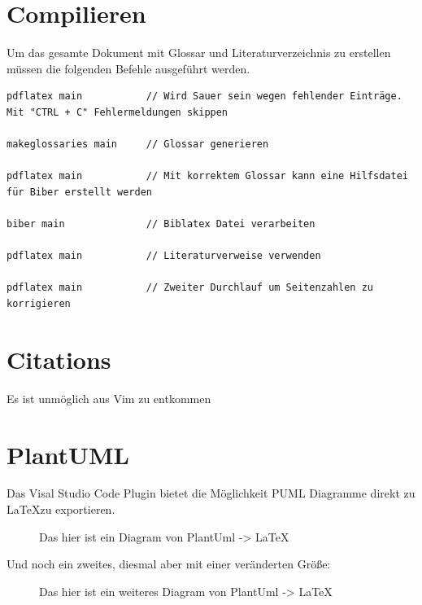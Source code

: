 \section{Compilieren}
Um das gesamte Dokument mit Glossar und Literaturverzeichnis zu erstellen müssen die folgenden Befehle ausgeführt werden.

\begin{lstlisting}[caption=Compilieren des Dokuments, label=CompileInstructions]
pdflatex main           // Wird Sauer sein wegen fehlender Einträge. Mit "CTRL + C" Fehlermeldungen skippen

makeglossaries main     // Glossar generieren

pdflatex main           // Mit korrektem Glossar kann eine Hilfsdatei für Biber erstellt werden

biber main              // Biblatex Datei verarbeiten

pdflatex main           // Literaturverweise verwenden

pdflatex main           // Zweiter Durchlauf um Seitenzahlen zu korrigieren
\end{lstlisting}

\section{Citations}
Es ist unmöglich aus Vim zu entkommen \cite{nerd_how_2012}

\section{PlantUML}
Das Visal Studio Code Plugin bietet die Möglichkeit PUML Diagramme direkt zu \LaTeX zu exportieren.

\begin{figure}[H]
    \centering
    
    \caption{Das hier ist ein Diagram von PlantUml -> \LaTeX}
\end{figure}

Und noch ein zweites, diesmal aber mit einer veränderten Größe:
\begin{figure}[H]
    \centering
    \resizebox{10cm}{!}{
        
    }
    \caption{Das hier ist ein weiteres Diagram von PlantUml -> \LaTeX}
\end{figure}